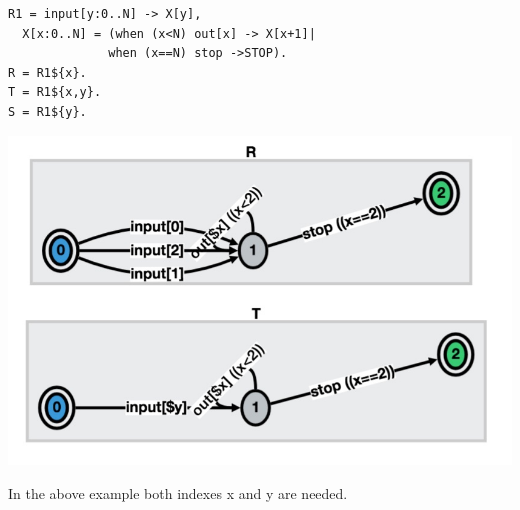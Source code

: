 \documentclass[]{article}
\begin{document}
\vspace{1em} \begin{minipage}{0.55\textwidth}
\begin{verbatim}
R1 = input[y:0..N] -> X[y],
  X[x:0..N] = (when (x<N) out[x] -> X[x+1]|
              when (x==N) stop ->STOP).
R = R1${x}.
T = R1${x,y}.
S = R1${y}.
   \end{verbatim}

\end{minipage}
\begin{minipage}{0.4\textwidth}
\begin{center}\includegraphics[scale=0.2]{VarBug2.jpg}\end{center}
\end{minipage}

In the above example both indexes {\sf x} and {\sf y} are needed.
\end{document}
